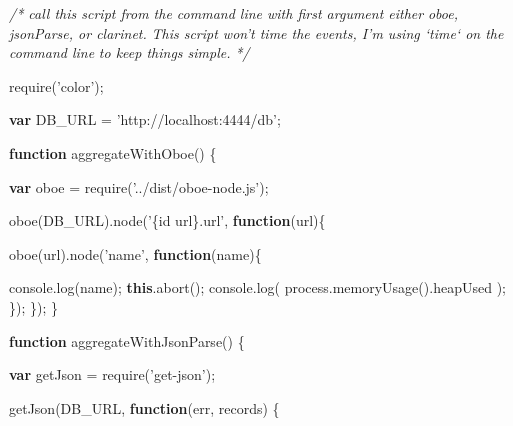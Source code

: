 \documentclass[12pt, ]{article}
\newenvironment{Shaded}{}{}
\newcommand{\KeywordTok}[1]{\textcolor[rgb]{0.00,0.44,0.13}{\textbf{{#1}}}}
\newcommand{\StringTok}[1]{\textcolor[rgb]{0.25,0.44,0.63}{{#1}}}
\newcommand{\CommentTok}[1]{\textcolor[rgb]{0.38,0.63,0.69}{\textit{{#1}}}}
\newcommand{\OtherTok}[1]{\textcolor[rgb]{0.00,0.44,0.13}{{#1}}}
\newcommand{\FunctionTok}[1]{\textcolor[rgb]{0.02,0.16,0.49}{{#1}}}
\newcommand{\NormalTok}[1]{{#1}}
\begin{document}

\label{src_benchmarkClient}

\begin{Shaded}
\begin{Highlighting}[]

\CommentTok{/* call this script from the command line with first argument either}
\CommentTok{    oboe, jsonParse, or clarinet.}
\CommentTok{    }
\CommentTok{   This script won't time the events, I'm using `time` on the command line}
\CommentTok{   to keep things simple.}
\CommentTok{ */}

\FunctionTok{require}\NormalTok{(}\StringTok{'color'}\NormalTok{);}

\KeywordTok{var} \NormalTok{DB_URL = }\StringTok{'http://localhost:4444/db'}\NormalTok{;  }


\KeywordTok{function} \FunctionTok{aggregateWithOboe}\NormalTok{() \{}

   \KeywordTok{var} \NormalTok{oboe = }\FunctionTok{require}\NormalTok{(}\StringTok{'../dist/oboe-node.js'}\NormalTok{);}
   
   \FunctionTok{oboe}\NormalTok{(DB_URL).}\FunctionTok{node}\NormalTok{(}\StringTok{'\{id url\}.url'}\NormalTok{, }\KeywordTok{function}\NormalTok{(url)\{}
           
      \FunctionTok{oboe}\NormalTok{(url).}\FunctionTok{node}\NormalTok{(}\StringTok{'name'}\NormalTok{, }\KeywordTok{function}\NormalTok{(name)\{}
                      
         \OtherTok{console}\NormalTok{.}\FunctionTok{log}\NormalTok{(name);}
         \KeywordTok{this}\NormalTok{.}\FunctionTok{abort}\NormalTok{();}
         \OtherTok{console}\NormalTok{.}\FunctionTok{log}\NormalTok{( }\OtherTok{process}\NormalTok{.}\FunctionTok{memoryUsage}\NormalTok{().}\FunctionTok{heapUsed} \NormalTok{);         }
      \NormalTok{\});      }
   \NormalTok{\});                 }
\NormalTok{\}}

\KeywordTok{function} \FunctionTok{aggregateWithJsonParse}\NormalTok{() \{}

   \KeywordTok{var} \NormalTok{getJson = }\FunctionTok{require}\NormalTok{(}\StringTok{'get-json'}\NormalTok{);}

   \FunctionTok{getJson}\NormalTok{(DB_URL, }\KeywordTok{function}\NormalTok{(err, records) \{}
       

\end{Highlighting}
\end{Shaded}
\end{document}
